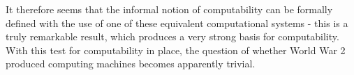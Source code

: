 \documentclass[Master.tex]{subfiles}
\begin{document}
It therefore seems that the informal notion of computability can be formally defined with the use of one of these equivalent computational systems - this is a truly remarkable result, which produces a very strong basis for computability. With this test for computability in place, the question of whether World War 2 produced computing machines becomes apparently trivial.
\end{document}
